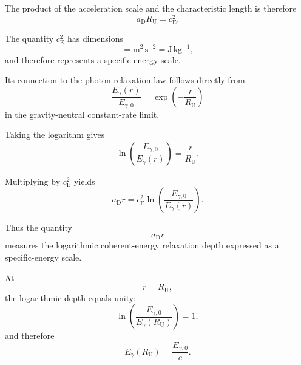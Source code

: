 The product of the acceleration scale and the characteristic length is
therefore
\begin{equation}
    \boxed{
    a_{\mathrm D}R_{\mathrm U}
    =
    c_{\mathrm E}^{2}.
    }
\end{equation}

The quantity $c_{\mathrm E}^{2}$ has dimensions
\begin{equation}
    [c_{\mathrm E}^{2}]
    =
    \mathrm{m^{2}\,s^{-2}}
    =
    \mathrm{J\,kg^{-1}},
\end{equation}
and therefore represents a specific-energy scale.

Its connection to the photon relaxation law follows directly from
\begin{equation}
    \frac{
        E_{\gamma}(r)
    }{
        E_{\gamma,0}
    }
    =
    \exp
    \left(
        -
        \frac{
            r
        }{
            R_{\mathrm U}
        }
    \right)
\end{equation}
in the gravity-neutral constant-rate limit.

Taking the logarithm gives
\begin{equation}
    \ln
    \left(
        \frac{
            E_{\gamma,0}
        }{
            E_{\gamma}(r)
        }
    \right)
    =
    \frac{
        r
    }{
        R_{\mathrm U}
    }.
\end{equation}

Multiplying by $c_{\mathrm E}^{2}$ yields
\begin{equation}
    \boxed{
    a_{\mathrm D}r
    =
    c_{\mathrm E}^{2}
    \ln
    \left(
        \frac{
            E_{\gamma,0}
        }{
            E_{\gamma}(r)
        }
    \right).
    }
\end{equation}

Thus the quantity
\begin{equation}
    a_{\mathrm D}r
\end{equation}
measures the logarithmic coherent-energy relaxation depth expressed as a
specific-energy scale.

At
\begin{equation}
    r
    =
    R_{\mathrm U},
\end{equation}
the logarithmic depth equals unity:
\begin{equation}
    \ln
    \left(
        \frac{
            E_{\gamma,0}
        }{
            E_{\gamma}(R_{\mathrm U})
        }
    \right)
    =
    1,
\end{equation}
and therefore
\begin{equation}
    E_{\gamma}(R_{\mathrm U})
    =
    \frac{
        E_{\gamma,0}
    }{
        e
    }.
\end{equation}

